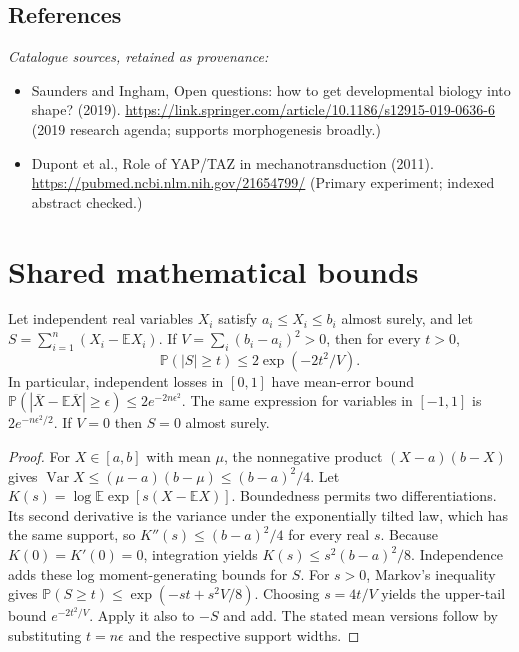 \documentclass[11pt]{article}
\begin{document}
\subsection{References}
\noindent\emph{Catalogue sources, retained as provenance:}
\begin{itemize}
\item Saunders and Ingham, Open questions: how to get developmental biology into shape? (2019). \url{https://link.springer.com/article/10.1186/s12915-019-0636-6} (2019 research agenda; supports morphogenesis broadly.)
\item Dupont et al., Role of YAP/TAZ in mechanotransduction (2011). \url{https://pubmed.ncbi.nlm.nih.gov/21654799/} (Primary experiment; indexed abstract checked.)
\end{itemize}




\section{Shared mathematical bounds}\label{app:bounds}
\begin{lemma}\label{lem:bounded}
Let independent real variables $X_i$ satisfy $a_i\leq X_i\leq b_i$ almost surely,
and let $S=\sum_{i=1}^n(X_i-\mathbb{E} X_i)$. If
$V=\sum_i(b_i-a_i)^2>0$, then for every $t>0$,
\[
 \mathbb{P}(|S|\geq t)\leq 2\exp(-2t^2/V).
\]
In particular, independent losses in $[0,1]$ have mean-error bound
$\mathbb{P}(|\overline X-\mathbb{E}\overline X|\geq\epsilon)
\leq2e^{-2n\epsilon^2}$. The same expression for variables in $[-1,1]$
is $2e^{-n\epsilon^2/2}$. If $V=0$ then $S=0$ almost surely.
\end{lemma}
\begin{proof}
For $X\in[a,b]$ with mean $\mu$, the nonnegative product
$(X-a)(b-X)$ gives
$\operatorname{Var} X\leq(\mu-a)(b-\mu)\leq(b-a)^2/4$.
Let $K(s)=\log\mathbb{E}\exp[s(X-\mathbb{E} X)]$.
Boundedness permits two differentiations. Its second derivative is the variance
under the exponentially tilted law, which has the same support, so
$K''(s)\leq(b-a)^2/4$ for every real $s$.
Because $K(0)=K'(0)=0$, integration yields
$K(s)\leq s^2(b-a)^2/8$.
Independence adds these log moment-generating bounds for $S$.
For $s>0$, Markov's inequality gives
$\mathbb{P}(S\geq t)\leq\exp(-st+s^2V/8)$.
Choosing $s=4t/V$ yields the upper-tail bound $e^{-2t^2/V}$.
Apply it also to $-S$ and add. The stated mean versions follow by substituting
$t=n\epsilon$ and the respective support widths.
\end{proof}
\end{document}
